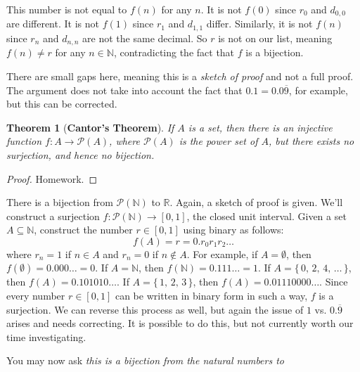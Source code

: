\documentclass{article}
\theoremstyle{plain}
\newtheorem{theorem}{Theorem}[section]
\theoremstyle{normal}
\begin{document}
        This number is not equal to $f(n)$ for any $n$. It is not
        $f(0)$ since $r_{0}$ and $d_{0,0}$ are different. It is not
        $f(1)$ since $r_{1}$ and $d_{1,1}$ differ. Similarly, it is not
        $f(n)$ since $r_{n}$ and $d_{n,n}$ are not the same decimal. So
        $r$ is not on our list, meaning $f(n)\ne{r}$ for any $n\in\mathbb{N}$,
        contradicting the fact that $f$ is a bijection.
        \par\hfill\par
        There are small gaps here, meaning this is a \textit{sketch of proof}
        and not a full proof. The argument does not take into account the fact
        that $0.1=0.0\overline{9}$, for example, but this can be corrected.
        \begin{theorem}[\textbf{Cantor's Theorem}]
            If $A$ is a set, then there is an injective function
            $f:A\rightarrow\mathcal{P}(A)$, where $\mathcal{P}(A)$ is the power
            set of $A$, but there exists no surjection, and hence no bijection.
        \end{theorem}
        \begin{proof}
            Homework.
        \end{proof}
        There is a bijection from $\mathcal{P}(\mathbb{N})$ to
        $\mathbb{R}$. Again, a sketch of proof is given. We'll construct a
        surjection $f:\mathcal{P}(\mathbb{N})\rightarrow[0,1]$, the closed
        unit interval. Given a set $A\subseteq\mathbb{N}$, construct the number
        $r\in[0,1]$ using binary as follows:
        \begin{equation}
            f(A)=r=0.r_{0}r_{1}r_{2}\dots
        \end{equation}
        where $r_{n}=1$ if $n\in{A}$ and $r_{n}=0$ if $n\notin{A}$. For
        example, if $A=\emptyset$, then
        $f(\emptyset)=0.000\dots=0$. If $A=\mathbb{N}$, then
        $f(\mathbb{N})=0.111\dots=1$. If $A=\{\,0,\,2,\,4,\,\dots\,\}$, then
        $f(A)=0.101010\dots$. If $A=\{\,1,\,2,\,3\,\}$, then
        $f(A)=0.01110000\dots$. Since every number $r\in[0,1]$ can be written
        in binary form in such a way, $f$ is a surjection. We can reverse this
        process as well, but again the issue of $1$ vs. $0.\overline{9}$ arises
        and needs correcting. It is possible to do this, but not currently worth
        our time investigating.
        \par\hfill\par
        You may now ask \textit{this is a bijection from the natural numbers to}
\end{document}
